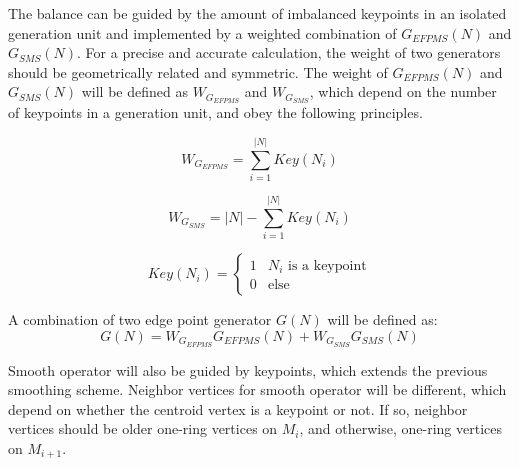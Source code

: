 \documentclass[10pt, conference, compsocconf]{IEEEtran}
\begin{document}
The balance can be guided by the amount of imbalanced keypoints in an isolated generation unit and implemented by a weighted combination of $G_{EFPMS}(N)$ and $G_{SMS}(N)$. For a precise and accurate calculation, the weight of two generators should be geometrically related and symmetric. The weight of $G_{EFPMS}(N)$ and $G_{SMS}(N)$ will be defined as $W_{G_{EFPMS}}$ and $W_{G_{SMS}}$, which depend on the number of keypoints in a generation unit, and obey the following principles.

\begin{equation}\label{Equation_W_G_EFPMS}
  W_{G_{EFPMS}}=\sum_{i=1}^{|N|}{Key(N_i)}
\end{equation}

\begin{equation}\label{Equation_W_G_SMS}
  W_{G_{SMS}}=|N|-\sum_{i=1}^{|N|}{Key(N_i)}
\end{equation}

\begin{equation}\label{Equation_Key}
  Key(N_i)=
    \begin{cases}
    1& \text{$N_i$ is a keypoint} \\
    0& \text{else}
    \end{cases}
\end{equation}

A combination of two edge point generator $G(N)$ will be defined as:
\begin{equation}\label{Equation_G}
  G(N)=W_{G_{EFPMS}}G_{EFPMS}(N)+W_{G_{SMS}}G_{SMS}(N)
\end{equation}

Smooth operator will also be guided by keypoints, which extends the previous smoothing scheme. Neighbor vertices for smooth operator will be different, which depend on whether the centroid vertex is a keypoint or not. If so, neighbor vertices should be older one-ring vertices on $M_i$, and otherwise, one-ring vertices on $M_{i+1}$.
\end{document}
